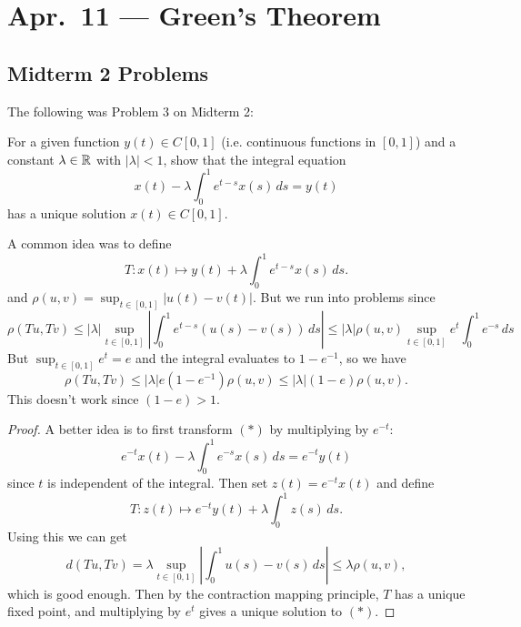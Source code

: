 \chapter{Apr.~11 --- Green's Theorem}

\section{Midterm 2 Problems}
The following was Problem 3 on Midterm 2:
\begin{exercise}
  For a given function $y(t) \in C[0, 1]$ (i.e. continuous
  functions in $[0, 1]$) and a constant $\lambda \in \mathbb{R}$
  with $|\lambda| < 1$, show that the integral equation
  \[
    x(t) - \lambda \int_0^1 e^{t - s} x(s)\, ds = y(t) \tag{$*$}
  \]
  has a unique solution $x(t) \in C[0, 1]$.
\end{exercise}

\begin{remark}
  A common idea was to define
  \[
    T : x(t) \mapsto y(t) + \lambda \int_0^1 e^{t - s} x(s)\, ds.
  \]
  and $\rho(u, v) = \sup_{t \in [0, 1]} |u(t) - v(t)|$.
  But we run into problems since
  \[
    \rho(Tu, Tv)
    \le |\lambda| \sup_{t \in [0, 1]} \left| \int_0^1 e^{t - s} (u(s) - v(s))\, ds \right|
    \le |\lambda| \rho(u, v) \sup_{t \in [0, 1]} e^t \int_0^1 e^{-s}\, ds
  \]
  But $\sup_{t \in [0, 1]} e^t = e$ and the integral
  evaluates to $1 - e^{-1}$, so we have
  \[
    \rho(Tu, Tv) \le |\lambda| e (1 - e^{-1}) \rho(u, v)
    \le |\lambda| (1 - e) \rho(u, v).
  \]
  This doesn't work since $(1 - e) > 1$.
\end{remark}

\begin{proof}
  A better idea is to first transform $(*)$ by
  multiplying by $e^{-t}$:
  \[
    e^{-t} x(t) - \lambda \int_0^1 e^{-s} x(s)\, ds = e^{-t} y(t)
  \]
  since $t$ is independent of the integral. Then set
  $z(t) = e^{-t} x(t)$ and define
  \[
    T : z(t) \mapsto e^{-t} y(t) + \lambda \int_0^1 z(s)\, ds.
  \]
  Using this we can get
  \[
    d(Tu, Tv) = \lambda \sup_{t \in [0, 1]} \left|\int_0^1 u(s) - v(s)\, ds\right|
    \le \lambda \rho(u, v),
  \]
  which is good enough. Then by the contraction
  mapping principle, $T$ has a unique fixed point, and
  multiplying by $e^t$ gives a unique solution to $(*)$.
\end{proof}

